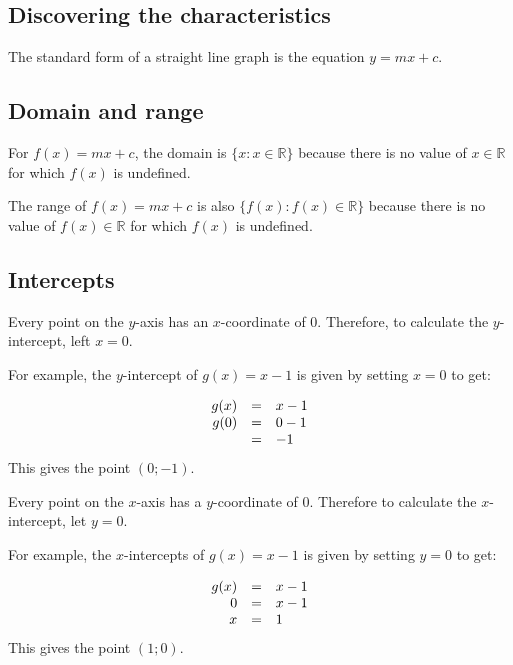
\subsection*{Discovering the characteristics} 
The standard form of a straight line graph is the equation $y=mx + c$. 
\subsection*{Domain and range}
\nopagebreak
For $f(x)=mx+c$, the domain is $\{x:x\in \mathbb{R}\}$ because there is no value of $x\in \mathbb{R}$ for which $f(x)$ is undefined.\par 
The range of $f(x)=mx+c$ is also $\{f(x):f(x)\in \mathbb{R}\}$ because there is no value of $f(x)\in \mathbb{R}$ for which $f(x)$ is undefined.\par 
\par 

\subsection*{Intercepts}

Every point on the $y$-axis has an $x$-coordinate of $0$. Therefore, to calculate the $y$-intercept, left $x=0$.\par
For example, the $y$-intercept of $g(x)=x-1$ is given by setting $x=0$ to get:\par 

\begin{equation*}
\begin{array}{ccl}\hfill g(x)& =& x-1\hfill \\
\hfill g(0) &=& 0-1\hfill \\
& =& -1\hfill 
\end{array}
\end{equation*}
This gives the point $(0;-1)$.\par


Every point on the $x$-axis has a $y$-coordinate of $0$. Therefore to calculate the $x$-intercept, let $y=0$. \par
For example, the $x$-intercepts of $g(x)=x-1$ is given by setting $y=0$ to get:\par 

\begin{equation*}
\begin{array}{ccl}\hfill g(x)& =& x-1\hfill \\
\hfill 0& =& x-1\hfill \\
\hfill x& =& 1\hfill 
\end{array}
\end{equation*}
This gives the point $(1;0)$.

